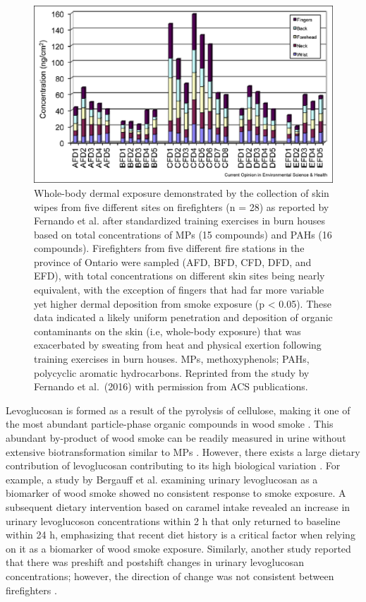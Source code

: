 \documentclass[preprint, 3p,
authoryear]{elsarticle} %
\begin{document}
\begin{figure}
\centering
\includegraphics{./Figures/Figure3.jpg}
\caption{Whole-body dermal exposure demonstrated by the collection of
skin wipes from five different sites on firefighters (n = 28) as
reported by Fernando et al. \citep{3} after standardized training
exercises in burn houses based on total concentrations of MPs (15
compounds) and PAHs (16 compounds). Firefighters from five different
fire stations in the province of Ontario were sampled (AFD, BFD, CFD,
DFD, and EFD), with total concentrations on different skin sites being
nearly equivalent, with the exception of fingers that had far more
variable yet higher dermal deposition from smoke exposure (p \textless{}
0.05). These data indicated a likely uniform penetration and deposition
of organic contaminants on the skin (i.e, whole-body exposure) that was
exacerbated by sweating from heat and physical exertion following
training exercises in burn houses. MPs, methoxyphenols; PAHs, polycyclic
aromatic hydrocarbons. Reprinted from the study by Fernando et
al.~(2016) with permission from ACS publications.}
\end{figure}

Levoglucosan is formed as a result of the pyrolysis of cellulose, making
it one of the most abundant particle-phase organic compounds in wood
smoke \citep{40}. This abundant by-product of wood smoke can be readily
measured in urine without extensive biotransformation similar to MPs
\citep{19}. However, there exists a large dietary contribution of
levoglucosan contributing to its high biological variation \citep{41}.
For example, a study by Bergauff et al. \citep{42} examining urinary
levoglucosan as a biomarker of wood smoke showed no consistent response
to smoke exposure. A subsequent dietary intervention based on caramel
intake revealed an increase in urinary levoglucoson concentrations
within 2 h that only returned to baseline within 24 h, emphasizing that
recent diet history is a critical factor when relying on it as a
biomarker of wood smoke exposure. Similarly, another study reported that
there was preshift and postshift changes in urinary levoglucosan
concentrations; however, the direction of change was not consistent
between firefighters \citep{43}.
\end{document}
